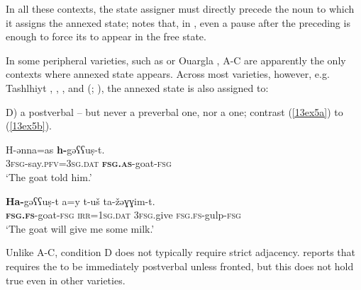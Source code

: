 \documentclass[output=paper,colorlinks,citecolor=brown]{langscibook}
\begin{document}
In all these contexts, the state assigner must directly precede the noun to which it assigns the annexed state; \citet[148]{heath2005-grammar} notes that, in , even a pause after the preceding  is enough to force its  to appear in the free state.

In some peripheral varieties, such as  \citep[362, 407]{gutova2021} or Ouargla \citep[79, 113]{delheureochoa2019}, A-C are apparently the only contexts where annexed state appears. Across most varieties, however, e.g. Tashlhiyt \citep[114--116]{elmoujahid1997},  \citep[147, 247]{heath2005-grammar},  \citep[25]{cortade1969}, and  (\citealt[88--89]{kossmann1997}; \citealt{kossmann2016}), the annexed state is also assigned to:

\medskip

\noindent D) a postverbal  -- but never a preverbal one, nor a  one; contrast (\ref{13ex5a}) to (\ref{13ex5b}).

\begin{exe}
	\ex \label{13ex5}  \citep[135]{djarallah1993}
	\begin{xlist}
		\ex \label{13ex5a}
		\gll H-ənna=as \textbf{h-}gəʕʕuṣ-t. \\
		\textsc{3fsg}-say.\textsc{pfv=3sg.dat} \textbf{\textsc{fsg.as}}-goat-\textsc{fsg} \\
		\trans ‘The goat told him.’
		
		\ex \label{13ex5b}
		\gll \textbf{Ha-}gəʕʕuṣ-t a=y t-uš ta-žəɣɣim-t. \\
		\textbf{\textsc{fsg.fs}}-goat-\textsc{fsg} \textsc{irr=1sg.dat} \textsc{3fsg.}give \textsc{fsg.fs-}gulp-\textsc{fsg} \\
		\trans ‘The goat will give me some milk.’
	\end{xlist}
\end{exe}

Unlike A-C, condition D does not typically require strict adjacency. \citet[573]{heath2005-grammar} reports that  requires the  to be immediately postverbal unless fronted, but this does not hold true even in other  varieties.
\end{document}
